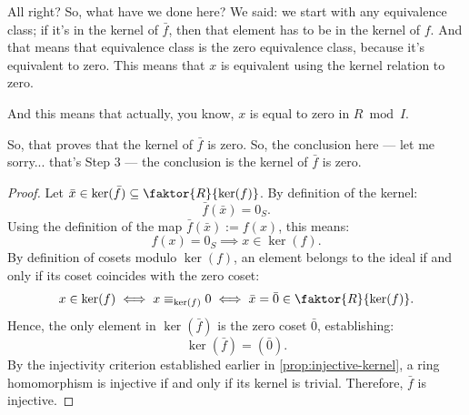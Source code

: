 \begin{proofWrapper}
\begin{speech}[01:04:17 - 01:06:42]
All right? So, what have we done here? We said: we start with any equivalence class; if it's in the kernel of $\bar{f}$, then that element has to be in the kernel of $f$. And that means that equivalence class is the zero equivalence class, because it's equivalent to zero. This means that $x$ is equivalent using the kernel relation to zero.  

And this means that actually, you know, $x$ is equal to zero in $R \bmod I$.  

So, that proves that the kernel of $\bar{f}$ is zero. So, the conclusion here --- let me sorry... that's Step 3 --- the conclusion is the kernel of $\bar{f}$ is zero.
\end{speech}

\begin{content}

\begin{proof}
Let $\bar{x} \in \ker(\bar{f}) \subseteq \faktor{R}{\ker(f)}$. By definition of the kernel:
\[
\bar{f}(\bar{x}) = 0_S.
\]
Using the definition of the map $\bar{f}(\bar{x}) := f(x)$, this means:
\[
f(x) = 0_S \implies x \in \ker(f).
\]
By definition of cosets modulo $\ker(f)$, an element belongs to the ideal if and only if its coset coincides with the zero coset:
\[
x \in \ker(f) \iff x \equiv_{\ker(f)} 0 \iff \bar{x} = \bar{0} \in \faktor{R}{\ker(f)}.
\]
Hence, the only element in $\ker(\bar{f})$ is the zero coset $\bar{0}$, establishing:
\[
\ker(\bar{f}) = (\bar{0}).
\]
By the injectivity criterion established earlier in \cref{prop:injective-kernel}, a ring homomorphism is injective if and only if its kernel is trivial. Therefore, $\bar{f}$ is injective.
\end{proof}


\end{content}
\end{proofWrapper}
